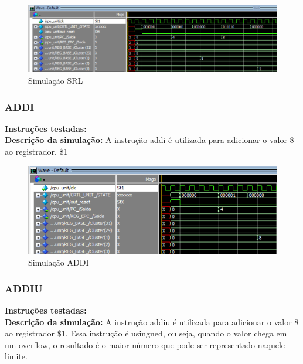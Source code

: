 \begin{figure}[htbp!]
\centering
\includegraphics[width=1\textwidth]{figure/simulacao_srl.png}
\caption{Simulação SRL} 
\label{fig:imagem_massa}
\end{figure}

\newpage

\subsubsection{ADDI}
\textbf{Instruções testadas:}
 \\

\textbf{Descrição da simulação:} A instrução addi é utilizada para adicionar o valor 8 ao registrador. \$1\\

\begin{figure}[htbp!]
\centering
\includegraphics[width=1\textwidth]{figure/simulacao_addi.png}
\caption{Simulação ADDI} 
\label{fig:imagem_massa}
\end{figure}

\subsubsection{ADDIU}
\textbf{Instruções testadas:}
 \\

\textbf{Descrição da simulação:} A instrução addiu é utilizada para adicionar o valor 8 ao registrador \$1. Essa instrução é usingned, ou seja, quando o valor chega em um overflow, o resultado é o maior número que pode ser representado naquele limite.\\

